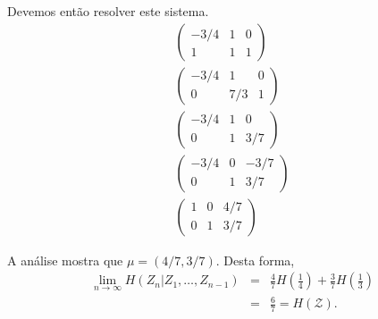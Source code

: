 \begin{questions}
\begin{solution}
\begin{parts}
Devemos então resolver este sistema.
\begin{eqnarray}
\left( \begin{array}{cc|c}
-3/4 & 1 & 0 \\
1    & 1 & 1
\end{array} \right)\\
\left( \begin{array}{cc|c}
-3/4 & 1   & 0 \\
0    & 7/3 & 1
\end{array} \right) \\
\left( \begin{array}{cc|c}
-3/4 & 1   & 0 \\
0    & 1   & 3/7
\end{array} \right) \\
\left( \begin{array}{cc|c}
-3/4 & 0   & -3/7 \\
0    & 1   & 3/7
\end{array} \right) \\
\left( \begin{array}{cc|c}
1  & 0   & 4/7 \\
0  & 1   & 3/7
\end{array} \right) 
\end{eqnarray}

A análise mostra que $\mu = (4/7, 3/7)$. Desta forma,
\begin{eqnarray}
\lim_{n \rightarrow \infty} H(Z_n | Z_1, \ldots, Z_{n-1}) &=& \frac{4}{7} H\left( \frac{1}{4} \right) + \frac{3}{7} H\left( \frac{1}{3} \right) \\
        &=& \frac{6}{7} = H(\mathcal{Z}) .
\end{eqnarray}


\end{parts}
\end{solution}
\end{questions}
